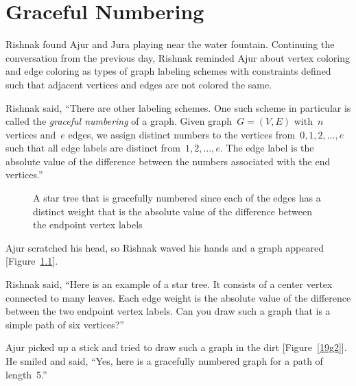 \chapter{Graceful Numbering}

Rishnak found Ajur and Jura playing near the water fountain. Continuing the conversation from the previous day, Rishnak reminded Ajur about vertex coloring and edge coloring as types of graph labeling schemes with constraints defined such that adjacent vertices and edges are not colored the same.

Rishnak said, ``There are other labeling schemes. One such scheme in particular is called the \textit{graceful numbering} of a graph. Given graph~$G=(V,E)$ with~$n$ vertices and~$e$ edges, we assign distinct numbers to the vertices from~$0,1,2,\ldots,e$ such that all edge labels are distinct from~$1,2,\ldots,e$. The edge label is the absolute value of the difference between the numbers associated with the end vertices.'' 

\begin{figure}
\begin{center}
\caption{A star tree that is gracefully numbered since each of the edges has a distinct weight that is the absolute value of the difference between the endpoint vertex labels}\label{19g1}
\end{center}
\end{figure}

Ajur scratched his head, so Rishnak waved his hands and a graph appeared [Figure~\ref{19g1}].

Rishnak said, ``Here is an example of a star tree. It consists of a center vertex connected to many leaves.  Each edge weight is the absolute value of the difference between the two endpoint vertex labels. Can you draw such a graph that is a simple path of six vertices?''

Ajur picked up a stick and tried to draw such a graph in the dirt [Figure~\ref{19g2}].  He smiled and said, ``Yes, here is a gracefully numbered graph for a path of length~5.''

